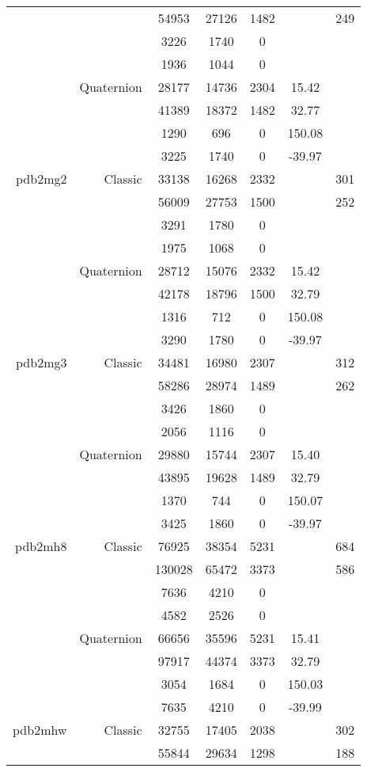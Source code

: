 \begin{xltabular}{\textwidth}{r|rcccSc}
& & 54953 & 27126 & 1482 & & 249 \\
& & 3226 & 1740 & 0 & & \\
& & 1936 & 1044 & 0 & & \\
& Quaternion & 28177 & 14736 & 2304 & 15.42 & \\
& & 41389 & 18372 & 1482 & 32.77 & \\
& & 1290 & 696 & 0 & 150.08 & \\
& & 3225 & 1740 & 0 & -39.97 & \\ \addlinespace
pdb2mg2 & Classic & 33138 & 16268 & 2332 & & 301 \\
& & 56009 & 27753 & 1500 & & 252 \\
& & 3291 & 1780 & 0 & & \\
& & 1975 & 1068 & 0 & & \\
& Quaternion & 28712 & 15076 & 2332 & 15.42 & \\
& & 42178 & 18796 & 1500 & 32.79 & \\
& & 1316 & 712 & 0 & 150.08 & \\
& & 3290 & 1780 & 0 & -39.97 & \\ \addlinespace
pdb2mg3 & Classic & 34481 & 16980 & 2307 & & 312 \\
& & 58286 & 28974 & 1489 & & 262 \\
& & 3426 & 1860 & 0 & & \\
& & 2056 & 1116 & 0 & & \\
& Quaternion & 29880 & 15744 & 2307 & 15.40 & \\
& & 43895 & 19628 & 1489 & 32.79 & \\
& & 1370 & 744 & 0 & 150.07 & \\
& & 3425 & 1860 & 0 & -39.97 & \\ \addlinespace
pdb2mh8 & Classic & 76925 & 38354 & 5231 & & 684 \\
& & 130028 & 65472 & 3373 & & 586 \\
& & 7636 & 4210 & 0 & & \\
& & 4582 & 2526 & 0 & & \\
& Quaternion & 66656 & 35596 & 5231 & 15.41 & \\
& & 97917 & 44374 & 3373 & 32.79 & \\
& & 3054 & 1684 & 0 & 150.03 & \\
& & 7635 & 4210 & 0 & -39.99 & \\ \addlinespace
pdb2mhw & Classic & 32755 & 17405 & 2038 & & 302 \\
& & 55844 & 29634 & 1298 & & 188 \\

\end{xltabular}

